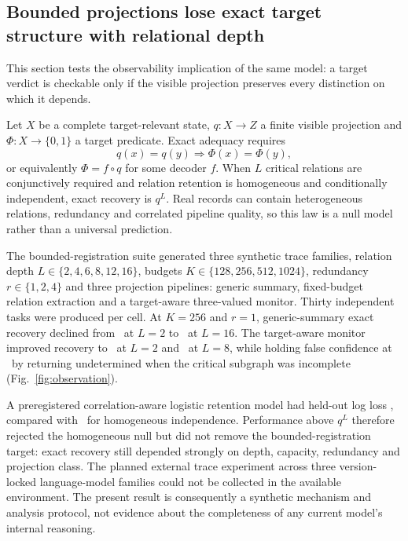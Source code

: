 \documentclass[10pt]{article}
\begin{document}
\subsection*{Bounded projections lose exact target structure with relational depth}
This section tests the observability implication of the same model: a target verdict is checkable only if the visible projection preserves every distinction on which it depends.

Let $X$ be a complete target-relevant state, $q:X\rightarrow Z$ a finite visible projection and $\Phi:X\rightarrow\{0,1\}$ a target predicate. Exact adequacy requires
\begin{equation}
q(x)=q(y)\Longrightarrow \Phi(x)=\Phi(y),
\label{eq:adequacy}
\end{equation}
or equivalently $\Phi=f\circ q$ for some decoder $f$. When $L$ critical relations are conjunctively required and relation retention is homogeneous and conditionally independent, exact recovery is $q^L$. Real records can contain heterogeneous relations, redundancy and correlated pipeline quality, so this law is a null model rather than a universal prediction.

The bounded-registration suite generated three synthetic trace families, relation depth $L\in\{2,4,6,8,12,16\}$, budgets $K\in\{128,256,512,1024\}$, redundancy $r\in\{1,2,4\}$ and three projection pipelines: generic summary, fixed-budget relation extraction and a target-aware three-valued monitor. Thirty independent tasks were produced per cell. At $K=256$ and $r=1$, generic-summary exact recovery declined from \GenericLTwo\ at $L=2$ to \GenericLSixteen\ at $L=16$. The target-aware monitor improved recovery to \MonitorLTwo\ at $L=2$ and \MonitorLEight\ at $L=8$, while holding false confidence at \MonitorFalseConfidence\ by returning undetermined when the critical subgraph was incomplete (Fig.~\ref{fig:observation}).

A preregistered correlation-aware logistic retention model had held-out log loss \RetentionBestLoss, compared with \RetentionIndLoss\ for homogeneous independence. Performance above $q^L$ therefore rejected the homogeneous null but did not remove the bounded-registration target: exact recovery still depended strongly on depth, capacity, redundancy and projection class. The planned external trace experiment across three version-locked language-model families could not be collected in the available environment. The present result is consequently a synthetic mechanism and analysis protocol, not evidence about the completeness of any current model's internal reasoning.
\end{document}
